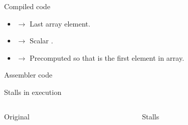 \begin{frame}[t]{Compiled code}
\begin{itemize}
  \item {} $\rightarrow$ Last array element.
  \item {} $\rightarrow$ Scalar .
  \item {} $\rightarrow$ Precomputed so that  is the first element in array.
\end{itemize}

\begin{block}{Assembler code}

\end{block}

\end{frame}

\begin{frame}[t]{Stalls in execution}

\begin{columns}[T]

\begin{column}{.45\textwidth}
\begin{block}{Original}

\end{block}
\end{column}

\pause
\begin{column}{.45\textwidth}
\begin{block}{Stalls}

\end{block}
\end{column}

\end{columns}
\end{frame}

